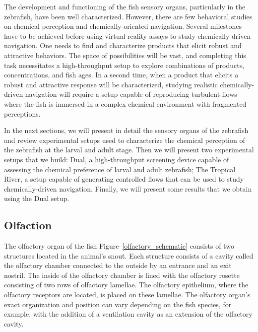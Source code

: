   The development and functioning of the fish sensory organs, particularly in the zebrafish, have been well characterized. However, there are few behavioral studies on chemical perception and chemically-oriented navigation. Several milestones have to be achieved before using virtual reality assays to study chemically-driven navigation. One needs to find and characterize products that elicit robust and attractive behaviors. The space of possibilities will be vast, and completing this task necessitates a high-throughput setup to explore combinations of products, concentrations, and fish ages. In a second time, when a product that elicits a robust and attractive response will be characterized, studying realistic chemically-driven navigation will require a setup capable of reproducing turbulent flows where the fish is immersed in a complex chemical environment with fragmented perceptions.

  In the next sections, we will present in detail the sensory organs of the zebrafish and review experimental setups used to characterize the chemical perception of the zebrafish at the larval and adult stage. Then we will present two experimental setups that we build: Dual, a high-throughput screening device capable of assessing the chemical preference of larval and adult zebrafish; The Tropical River, a setup capable of generating controlled flows that can be used to study chemically-driven navigation. Finally, we will present some results that we obtain using the Dual setup.


    \subsection{Olfaction}
    The olfactory organ of the fish Figure~\ref{olfactory_schematic} consists of two structures located in the animal's snout. Each structure consists of a cavity called the olfactory chamber connected to the outside by an entrance and an exit nostril. The inside of the olfactory chamber is lined with the olfactory rosette consisting of two rows of olfactory lamellae. The olfactory epithelium, where the olfactory receptors are located, is placed on these lamellae. The olfactory organ's exact organization and position can vary depending on the fish species, for example, with the addition of a ventilation cavity as an extension of the olfactory cavity.

